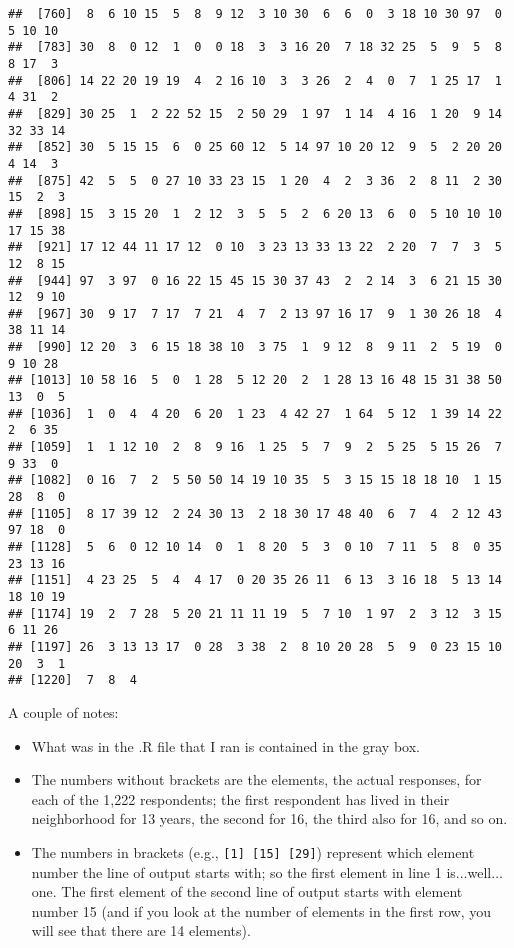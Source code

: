 \documentclass[]{article}
\begin{document}
\begin{verbatim}
##  [760]  8  6 10 15  5  8  9 12  3 10 30  6  6  0  3 18 10 30 97  0  5 10 10
##  [783] 30  8  0 12  1  0  0 18  3  3 16 20  7 18 32 25  5  9  5  8  8 17  3
##  [806] 14 22 20 19 19  4  2 16 10  3  3 26  2  4  0  7  1 25 17  1  4 31  2
##  [829] 30 25  1  2 22 52 15  2 50 29  1 97  1 14  4 16  1 20  9 14 32 33 14
##  [852] 30  5 15 15  6  0 25 60 12  5 14 97 10 20 12  9  5  2 20 20  4 14  3
##  [875] 42  5  5  0 27 10 33 23 15  1 20  4  2  3 36  2  8 11  2 30 15  2  3
##  [898] 15  3 15 20  1  2 12  3  5  5  2  6 20 13  6  0  5 10 10 10 17 15 38
##  [921] 17 12 44 11 17 12  0 10  3 23 13 33 13 22  2 20  7  7  3  5 12  8 15
##  [944] 97  3 97  0 16 22 15 45 15 30 37 43  2  2 14  3  6 21 15 30 12  9 10
##  [967] 30  9 17  7 17  7 21  4  7  2 13 97 16 17  9  1 30 26 18  4 38 11 14
##  [990] 12 20  3  6 15 18 38 10  3 75  1  9 12  8  9 11  2  5 19  0  9 10 28
## [1013] 10 58 16  5  0  1 28  5 12 20  2  1 28 13 16 48 15 31 38 50 13  0  5
## [1036]  1  0  4  4 20  6 20  1 23  4 42 27  1 64  5 12  1 39 14 22  2  6 35
## [1059]  1  1 12 10  2  8  9 16  1 25  5  7  9  2  5 25  5 15 26  7  9 33  0
## [1082]  0 16  7  2  5 50 50 14 19 10 35  5  3 15 15 18 18 10  1 15 28  8  0
## [1105]  8 17 39 12  2 24 30 13  2 18 30 17 48 40  6  7  4  2 12 43 97 18  0
## [1128]  5  6  0 12 10 14  0  1  8 20  5  3  0 10  7 11  5  8  0 35 23 13 16
## [1151]  4 23 25  5  4  4 17  0 20 35 26 11  6 13  3 16 18  5 13 14 18 10 19
## [1174] 19  2  7 28  5 20 21 11 11 19  5  7 10  1 97  2  3 12  3 15  6 11 26
## [1197] 26  3 13 13 17  0 28  3 38  2  8 10 20 28  5  9  0 23 15 10 20  3  1
## [1220]  7  8  4
\end{verbatim}

A couple of notes:

\begin{itemize}
\item
  What was in the .R file that I ran is contained in the gray box.
\item
  The numbers without brackets are the elements, the actual responses,
  for each of the 1,222 respondents; the first respondent has lived in
  their neighborhood for 13 years, the second for 16, the third also for
  16, and so on.
\item
  The numbers in brackets (e.g., {\texttt{{[}1{]}\ {[}15{]}\ {[}29{]}}})
  represent which element number the line of output starts with; so the
  first element in line 1 is\(\ldots\)well\(\ldots\)one. The first
  element of the second line of output starts with element number 15
  (and if you look at the number of elements in the first row, you will
  see that there are 14 elements).
\end{itemize}
\end{document}
